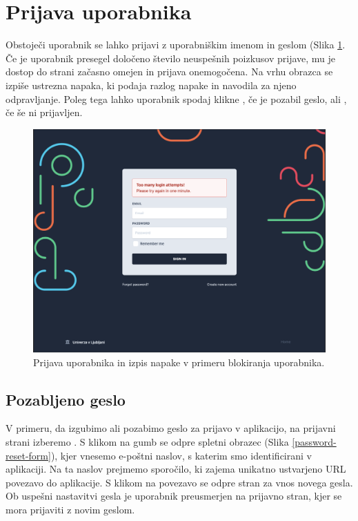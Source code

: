 \newpage
\section{Prijava uporabnika }
\label{sign-in-page}
Obstoječi uporabnik se lahko prijavi z uporabniškim imenom in geslom (Slika \ref{login-form}. Če je uporabnik presegel določeno število neuspešnih poizkusov prijave, mu je dostop do strani začasno omejen in prijava onemogočena. Na vrhu obrazca se izpiše ustrezna napaka, ki podaja razlog napake in navodila za njeno odpravljanje. Poleg tega lahko uporabnik spodaj klikne , če je pozabil geslo, ali , če še ni prijavljen.


\begin{figure}[h]
\begin{center}
\includegraphics[width=1\textwidth]{slike/signin-throttling.png}
\end{center}
\caption{ Prijava uporabnika in izpis napake v primeru blokiranja uporabnika. }
\label{login-form}
\end{figure}

\subsection{Pozabljeno geslo}
\label{forgotten-form}
V primeru, da izgubimo ali pozabimo geslo za prijavo v aplikacijo, na prijavni strani izberemo . S klikom na gumb se odpre spletni obrazec (Slika \ref{password-reset-form}), kjer vnesemo e-poštni naslov, s katerim smo identificirani v aplikaciji. Na ta naslov prejmemo sporočilo, ki zajema unikatno ustvarjeno URL povezavo do aplikacije. S klikom na povezavo se odpre stran za vnos novega gesla. Ob uspešni nastavitvi gesla je uporabnik preusmerjen na prijavno stran, kjer se mora prijaviti z novim geslom.

